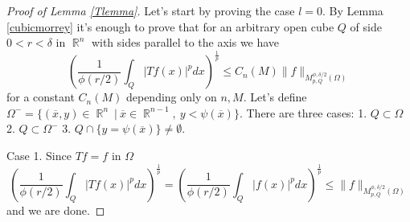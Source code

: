 \documentclass[12pt]{article}
\theoremstyle{definition}
\DeclareMathOperator\rr{\mathbb{R}}
\begin{document}
\begin{proof}[Proof of Lemma \ref{Tlemma}]
Let's start by proving the case $l=0$. By Lemma \ref{cubicmorrey} it's enough to prove that for an arbitrary open cube $Q$ of side $0<r<\delta$ in $\rr^n$ with sides parallel to the axis we have
\begin{equation}
\left(\frac{1}{\phi(r/2)}\int_Q |Tf(x)|^pdx \right)^{\frac{1}{p}} \le C_n(M) \| f\|_{M_{p,Q}^{\phi,\delta/2}(\Omega)} \label{cubestimate}
\end{equation}
for a constant $C_n(M)$ depending only on $n,M$. Let's define  $\Omega^- = \{ (\overline x , y) \in \rr^n \ | \ \overline x \in \rr^{n-1}, \ y<\psi(\overline x) \}$. There are three cases: 1. $Q \subset \Omega$ 2. $Q \subset \Omega^-$ 3. $Q\cap \{y=\psi(\overline x)\} \neq \emptyset.$ 

Case 1. Since $Tf=f$ in $\Omega$
\[ \left(\frac{1}{\phi(r/2)}\int_Q |Tf(x)|^pdx \right)^{\frac{1}{p}}=\left(\frac{1}{\phi(r/2)}\int_Q |f(x)|^pdx \right)^{\frac{1}{p}} \le  \| f\|_{M_{p,Q}^{\phi,\delta/2}(\Omega)}\]
and we are done.


\end{proof}
\end{document}
